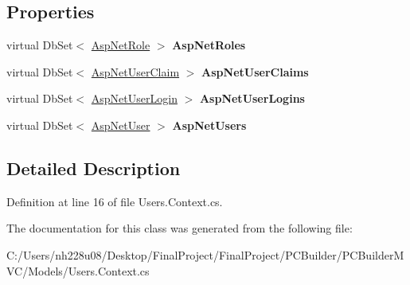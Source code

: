 \subsection*{Properties}
\begin{DoxyCompactItemize}
\item 
virtual Db\+Set$<$ \hyperlink{class_p_c_builder_m_v_c_1_1_models_1_1_asp_net_role}{Asp\+Net\+Role} $>$ {\bfseries Asp\+Net\+Roles}\hypertarget{class_p_c_builder_m_v_c_1_1_models_1_1_user_entities_a97ad62df5e44eb5d06b4faef97066545}{}\label{class_p_c_builder_m_v_c_1_1_models_1_1_user_entities_a97ad62df5e44eb5d06b4faef97066545}

\item 
virtual Db\+Set$<$ \hyperlink{class_p_c_builder_m_v_c_1_1_models_1_1_asp_net_user_claim}{Asp\+Net\+User\+Claim} $>$ {\bfseries Asp\+Net\+User\+Claims}\hypertarget{class_p_c_builder_m_v_c_1_1_models_1_1_user_entities_adce18308000a7a93875ade45b503e94e}{}\label{class_p_c_builder_m_v_c_1_1_models_1_1_user_entities_adce18308000a7a93875ade45b503e94e}

\item 
virtual Db\+Set$<$ \hyperlink{class_p_c_builder_m_v_c_1_1_models_1_1_asp_net_user_login}{Asp\+Net\+User\+Login} $>$ {\bfseries Asp\+Net\+User\+Logins}\hypertarget{class_p_c_builder_m_v_c_1_1_models_1_1_user_entities_ad930890fad3392c62f1915b2baea7f67}{}\label{class_p_c_builder_m_v_c_1_1_models_1_1_user_entities_ad930890fad3392c62f1915b2baea7f67}

\item 
virtual Db\+Set$<$ \hyperlink{class_p_c_builder_m_v_c_1_1_models_1_1_asp_net_user}{Asp\+Net\+User} $>$ {\bfseries Asp\+Net\+Users}\hypertarget{class_p_c_builder_m_v_c_1_1_models_1_1_user_entities_a0bdbcfd5cd36963f3b56d2a28eee0b59}{}\label{class_p_c_builder_m_v_c_1_1_models_1_1_user_entities_a0bdbcfd5cd36963f3b56d2a28eee0b59}

\end{DoxyCompactItemize}


\subsection{Detailed Description}


Definition at line 16 of file Users.\+Context.\+cs.



The documentation for this class was generated from the following file\+:\begin{DoxyCompactItemize}
\item 
C\+:/\+Users/nh228u08/\+Desktop/\+Final\+Project/\+Final\+Project/\+P\+C\+Builder/\+P\+C\+Builder\+M\+V\+C/\+Models/Users.\+Context.\+cs\end{DoxyCompactItemize}

